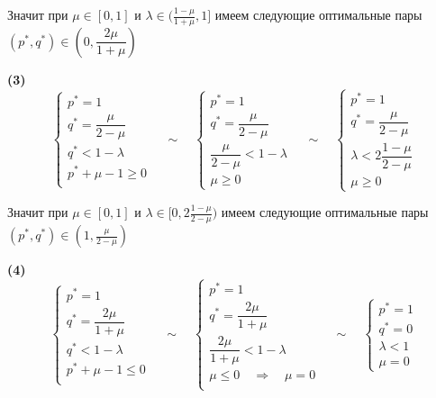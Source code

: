 Значит при $\mu \in [0, 1]$ и $\lambda \in (\frac{1-\mu}{1+\mu}, 1]$
имеем следующие оптимальные пары
$(p^*, q^*) \in (0, \dfrac{2\mu}{1 + \mu})$

\hspace{5mm}

\textbf{(3)}
$$
	\begin{cases}
		p^* = 1 \\
		q^* = \dfrac{\mu}{2-\mu} \\
		q^* < 1 - \lambda \\
		p^* + \mu - 1 \geqslant 0 \\
	\end{cases}
	\quad \sim \quad
	\begin{cases}
		p^* = 1 \\
		q^* = \dfrac{\mu}{2-\mu} \\
		\dfrac{\mu}{2-\mu} < 1 - \lambda \\
		\mu \geqslant 0
	\end{cases}
	\quad \sim \quad
	\begin{cases}
		p^* = 1 \\
		q^* = \dfrac{\mu}{2-\mu} \\
		\lambda < 2\dfrac{1-\mu}{2-\mu} \\
		\mu \geqslant 0
	\end{cases}
$$

Значит при $\mu \in [0, 1]$ и $\lambda \in [0, 2\frac{1-\mu}{2-\mu})$
имеем следующие оптимальные пары
$ (p^*, q^*) \in (1, \frac{\mu}{2 - \mu})$

\hspace{5mm}

\textbf{(4)}
$$
	\begin{cases}
		p^* = 1 \\
		q^* = \dfrac{2\mu}{1+\mu} \\
		q^* < 1 - \lambda \\
		p^* + \mu - 1 \leqslant 0 \\
	\end{cases}
	\quad \sim \quad
	\begin{cases}
		p^* = 1 \\
		q^* = \dfrac{2\mu}{1+\mu} \\
		\dfrac{2\mu}{1+\mu} < 1 - \lambda \\
		\mu \leqslant 0 \quad \Rightarrow \quad \mu = 0 \\
	\end{cases}
	\quad \sim \quad
	\begin{cases}
		p^* = 1 \\
		q^* = 0 \\
		\lambda < 1 \\
		\mu = 0
	\end{cases}
$$

